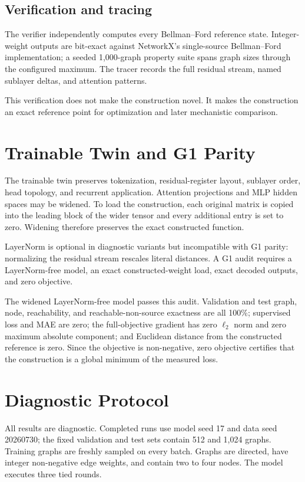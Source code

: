 \documentclass[10pt,twocolumn]{article}
\newcommand{\gparity}{\textsc{G1}}
\begin{document}
\subsection{Verification and tracing}

The verifier independently computes every Bellman--Ford reference state.
Integer-weight outputs are bit-exact against NetworkX's single-source
Bellman--Ford implementation; a seeded 1,000-graph property suite spans graph
sizes through the configured maximum. The tracer records the full residual
stream, named sublayer deltas, and attention patterns.

This verification does not make the construction novel. It makes the
construction an exact reference point for optimization and later mechanistic
comparison.

\section{Trainable Twin and \gparity{} Parity}

The trainable twin preserves tokenization, residual-register layout, sublayer
order, head topology, and recurrent application. Attention projections and MLP
hidden spaces may be widened. To load the construction, each original matrix
is copied into the leading block of the wider tensor and every additional
entry is set to zero. Widening therefore preserves the exact constructed
function.

LayerNorm is optional in diagnostic variants but incompatible with \gparity{}
parity: normalizing the residual stream rescales literal distances. A
\gparity{} audit requires a LayerNorm-free model, an exact constructed-weight
load, exact decoded outputs, and zero objective.

The widened LayerNorm-free model passes this audit. Validation and test graph,
node, reachability, and reachable-non-source exactness are all 100\%;
supervised loss and MAE are zero; the full-objective gradient has zero
\(\ell_2\) norm and zero maximum absolute component; and Euclidean distance
from the constructed reference is zero. Since the objective is non-negative,
zero objective certifies that the construction is a global minimum of the
measured loss.

\section{Diagnostic Protocol}

All results are diagnostic. Completed runs use model seed 17 and data seed
20260730; the fixed validation and test sets contain 512 and 1,024 graphs.
Training graphs are freshly sampled on every batch. Graphs are directed, have
integer non-negative edge weights, and contain two to four nodes. The model
executes three tied rounds.
\end{document}
